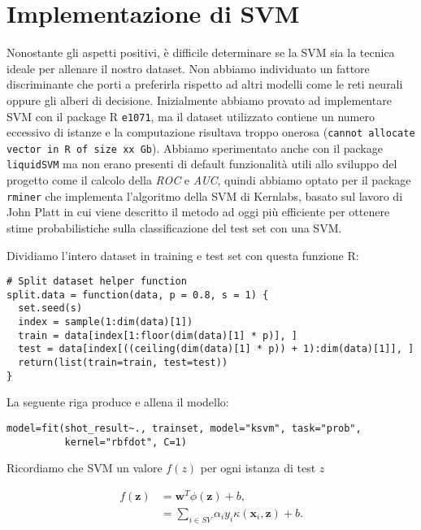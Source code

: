 \section{Implementazione di SVM}

Nonostante gli aspetti positivi, è difficile determinare se la SVM sia la tecnica ideale per allenare il nostro dataset. Non abbiamo individuato un fattore discriminante che porti a preferirla rispetto ad altri modelli come le reti neurali oppure gli alberi di decisione.
Inizialmente abbiamo provato ad implementare SVM con il package R \texttt{e1071}, ma il dataset utilizzato contiene un numero eccessivo di istanze e la computazione risultava troppo onerosa (\texttt{cannot allocate vector in R of size xx Gb}). Abbiamo sperimentato anche con il package \texttt{liquidSVM} ma non erano presenti di default funzionalità utili allo sviluppo del progetto come il calcolo della \textit{ROC} e \textit{AUC}, quindi abbiamo optato per il package \texttt{rminer} che implementa l'algoritmo della SVM di Kernlabs, basato sul lavoro di John Platt \cite{Platt99probabilisticoutputs} in cui viene descritto il metodo ad oggi più efficiente per ottenere stime probabilistiche sulla classificazione del test set con una SVM.

Dividiamo l'intero dataset in training e test set con questa funzione R:

\begin{verbatim}
# Split dataset helper function
split.data = function(data, p = 0.8, s = 1) {
  set.seed(s)
  index = sample(1:dim(data)[1])
  train = data[index[1:floor(dim(data)[1] * p)], ]
  test = data[index[((ceiling(dim(data)[1] * p)) + 1):dim(data)[1]], ]
  return(list(train=train, test=test))
}
\end{verbatim}

La seguente riga produce e allena il modello:

\begin{verbatim}
model=fit(shot_result~., trainset, model="ksvm", task="prob", 
          kernel="rbfdot", C=1)
\end{verbatim}

Ricordiamo che SVM un valore $ f(z) $ per ogni istanza di test $z$

\begin{align}
f(\mathbf{z}) &= \mathbf{w}^T\phi(\mathbf{z}) + b, \\
&= \sum_{i\in SV} \alpha_i y_i \kappa(\mathbf{x}_i,\mathbf{z}) + b.
\end{align}

